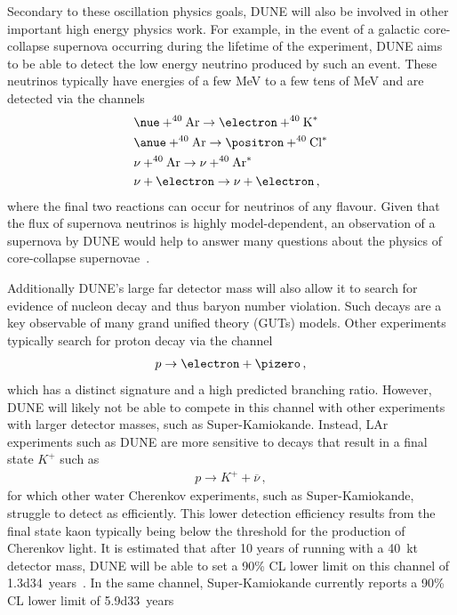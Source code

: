 Secondary to these oscillation physics goals, DUNE will also be involved in other important high energy physics work.
For example, in the event of a galactic core-collapse supernova occurring during the lifetime of the experiment, DUNE aims to be able to detect the low energy neutrino produced by such an event.
These neutrinos typically have energies of a few \si{\mega\electronvolt} to a few tens of \si{\mega\electronvolt} and are detected via the channels
\begin{align}
  &\nue + ^{40}\text{Ar} \rightarrow \electron + ^{40}\text{K}^{*} \\
  &\anue + ^{40}\text{Ar} \rightarrow \positron + ^{40}\text{Cl}^{*} \\
  &\nu + ^{40}\text{Ar} \rightarrow \nu + ^{40}\text{Ar}^{*} \\
  &\nu + \electron \rightarrow \nu + \electron \, ,
\end{align}
where the final two reactions can occur for neutrinos of any flavour.
Given that the flux of supernova neutrinos is highly model-dependent, an observation of a supernova by DUNE would help to answer many questions about the physics of core-collapse supernovae~\cite{duneSupernova}. 

Additionally DUNE's large far detector mass will also allow it to search for evidence of nucleon decay and thus baryon number violation.
Such decays are a key observable of many grand unified theory (GUTs) models.
Other experiments typically search for proton decay via the channel
\begin{align}
  p \rightarrow \electron + \pizero \, ,
\end{align}
which has a distinct signature and a high predicted branching ratio.
However, DUNE will likely not be able to compete in this channel with other experiments with larger detector masses, such as Super-Kamiokande.
Instead, LAr experiments such as DUNE are more sensitive to decays that result in a final state $K^{+}$ such as 
\begin{align}
  p \rightarrow K^{+} + \overline{\nu} \, ,
\end{align}
for which other water Cherenkov experiments, such as Super-Kamiokande, struggle to detect as efficiently.
This lower detection efficiency results from the final state kaon typically being below the threshold for the production of Cherenkov light.
It is estimated that after 10 years of running with a \SI{40}{\kilo\tonne} detector mass, DUNE will be able to set a 90\% CL lower limit on this channel of \num{1.3d34}~years~\cite{duneBSM}.
In the same channel, Super-Kamiokande currently reports a 90\% CL lower limit of \num{5.9d33}~years~\cite{SKProtonDecay}

